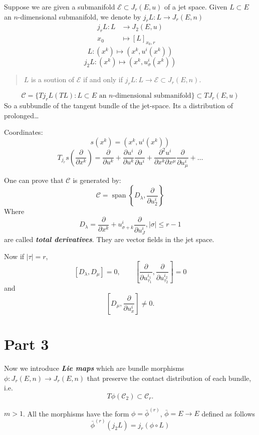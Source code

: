 Suppose we are given a submanifold $\mathcal{E} \subset J_r(E,u)$ of a jet space. Given $L \subset E$ an $n$-dimensional submanifold, we denote by $j_rL: L \to J_r(E,n)$
\begin{align*}
	j_rL: L &\longrightarrow J_2(E,u) \\
	x_0 &\longmapsto [L]_{x_0,r}
\end{align*}
 \[L:(x^k)\mapsto (x^k,u^i(x^k))\]
 \[j_2L:(x^k)\mapsto (x^k,u^i_\sigma(x^k))\]

 \begin{quotation}
 	$L$ is a soution of $\mathcal{E}$ if and only if $j_rL:L \to \mathcal{E} \subset J_r(E,n)$.
 \end{quotation}
 
\[\mathcal{C}=\{Tj_rL(TL):L \subset E \text{ an $n$-dimensional submanifold} \}\subset T J_r(E,u)\]
So a subbundle of the tangent bundle of the jet-space. Its a distribution of prolonged…

Coordinates: 
\[s(x^k)=(x^k, u^i(x^k))\]
\[T_{j_r}s\left( \frac{\partial }{\partial x^k} \right) =\frac{\partial }{\partial u^k}+\frac{\partial u^i}{\partial u^k}\frac{\partial }{\partial u^i}+\frac{\partial^2 u^i}{\partial x^k \partial x^\mu}\frac{\partial }{\partial u^i_\mu}+\ldots\]

One can prove that $\mathcal{C}$ is generated by:
\[\mathcal{C}=\operatorname{s p a n}\left\{ D_\lambda ,\frac{\partial }{\partial u^i_2}\right\}\]
Where
\[D_\lambda=\frac{\partial }{\partial x^k}+u^i_{\sigma+k}\frac{\partial }{\partial u^i_J},|\sigma|\leq r-1 \]
are called \textit{\textbf{total derivatives}}. They are vector fields in the jet space.
 
Now if $|\tau|=r$,
\[[D_\lambda,D_\mu]=0,\qquad \left[ \frac{\partial }{\partial u^{i_1}_{\tau_1}},\frac{\partial }{\partial u^{i_2}_{\tau_2}} \right] =0\]
and
\[\left[ D_\mu,\frac{\partial }{\partial u^i_x} \right] \neq 0.\]

\section{Part 3}

Now we introduce \textit{\textbf{Lie maps}} which are bundle morphisms  $\phi:J_r(E,n) \to J_r(E,n)$ that preserve the contact distribution of each bundle, i.e.
 \[T\phi(\mathcal{C}_2)\subset \mathcal{C}_r.\]

 \begin{thm}\leavevmode
 $m>1$. All the morphisms have the form $\phi=\bar{\phi}^{(r)}$, $\bar{\phi} =E \to E$ defined as follows
 \[\bar{\phi}^{(r)}(j_2L)=j_r(\phi \circ L)\]
 \end{thm}

